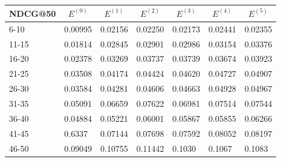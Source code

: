 \begin{table*}[]
    \begin{tabular}{|l|l|l|l|l|l|l|}
    \hline
    NDCG@50 & \multicolumn{1}{c|}{$E^{(0)}$} & \multicolumn{1}{c|}{$E^{(1)}$} & \multicolumn{1}{c|}{$E^{(2)}$} & \multicolumn{1}{c|}{$E^{(3)}$} & \multicolumn{1}{c|}{$E^{(4)}$} & \multicolumn{1}{c|}{$E^{(5)}$} \\ \hline
    6-10    & 0.00995                        & 0.02156                        & 0.02250                        & 0.02173                        & 0.02441                        & 0.02355                        \\ \hline
    11-15   & 0.01814                        & 0.02845                        & 0.02901                        & 0.02986                        & 0.03154                        & 0.03376                        \\ \hline
    16-20   & 0.02378                        & 0.03269                        & 0.03737                        & 0.03739                        & 0.03674                        & 0.03923                        \\ \hline
    21-25   & 0.03508                        & 0.04174                        & 0.04424                        & 0.04620                        & 0.04727                        & 0.04907                        \\ \hline
    26-30   & 0.03584                        & 0.04281                        & 0.04606                        & 0.04663                        & 0.04928                        & 0.04967                        \\ \hline
    31-35   & 0.05091                        & 0.06659                        & 0.07622                        & 0.06981                        & 0.07514                        & 0.07544                        \\ \hline
    36-40   & 0.04884                        & 0.05221                        & 0.06001                        & 0.05867                        & 0.05855                        & 0.06266                        \\ \hline
    41-45   & 0.6337                         & 0.07144                        & 0.07698                        & 0.07592                        & 0.08052                        & 0.08197                        \\ \hline
    46-50   & 0.09049                        & 0.10755                        & 0.11442                        & 0.1030                         & 0.1067                         & 0.1083                         \\ \hline

\end{tabular}
\end{table*}
